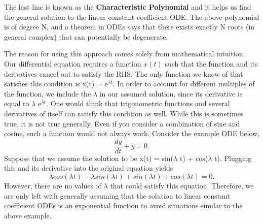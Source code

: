 \documentclass{article}
\newcommand{\be}{\begin{equation}}
\newcommand{\ee}{\end{equation}}
\begin{document}
The last line is known as the \textbf{Characteristic Polynomial} and it helps us find the general solution to the linear constant coefficient ODE.
The above polynomial is of degree N, and a theorem in  ODEs says that there exists exactly N roots (in general complex) that can potentially be degenerate.

The reason for using this approach comes solely from mathematical intuition.
Our differential equation requires a function $x(t)$ such that the function and its derivatives cancel out to satisfy the RHS.
The only function we know of that satisfies this condition is x(t) = e$^{\lambda t}$.
In order to account for different multiples of the function, we include the $\lambda$ in our assumed solution, since its derivative is equal to $\lambda$ e$^{\lambda t}$.
One would think that trigonometric functions and several derivatives of itself can satisfy this condition as well.
While this is sometimes true, it is not true generally.
Even if you consider a combination of sine and cosine, such a function would not always work.
Consider the example ODE below,
\be
\frac{dy}{dt} + y = 0 .
\ee
Suppose that we assume the solution to be x(t) = sin($\lambda$ t) + cos($\lambda$ t).
Plugging this and its derivative into the original equation yields
\be
\lambda cos(\lambda t) - \lambda sin(\lambda t) + sin(\lambda t) + cos(\lambda t) = 0 .
\ee
However, there are no values of $\lambda$ that could satisfy this equation.
Therefore, we are only left with generally assuming that the solution to linear constant coefficient ODEs is an exponential function to avoid situations similar to the above example.
\end{document}
